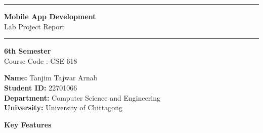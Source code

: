 \documentclass{article}
\begin{document}


\begin{titlepage}

\begin{center}

\vspace*{1cm}

\noindent\rule{\textwidth}{1.2pt}

\vspace{0.5cm}

{\Huge \bfseries Mobile App Development}\\[0.3cm]

{\large Lab Project Report}

\vspace{0.5cm}

\noindent\rule{\textwidth}{0.8pt}

\vspace{1.5cm}

\begin{tcolorbox}[
colback=white,
colframe=primary,
width=0.7\textwidth,
arc=6pt,
boxrule=1pt
]
\centering
\Large \textbf{6th Semester}\\[6pt]
\normalsize
Course Code : CSE 618
\end{tcolorbox}

\vspace{1.5cm}

\begin{tcolorbox}[
colback=white,
colframe=secondary,
width=0.7\textwidth,
arc=6pt
]
\begin{flushleft}
\textbf{Name:} Tanjim Tajwar Arnab\\
\textbf{Student ID:} 22701066\\
\textbf{Department:} Computer Science and Engineering\\
\textbf{University:} University of Chittagong
\end{flushleft}
\end{tcolorbox}

\vspace{1cm}

\begin{tcolorbox}[
colback=softblue,
colframe=primary,
width=0.7\textwidth,
arc=6pt
]
\small
\centering
\textbf{Key Features}\\


\end{tcolorbox}
\end{center}
\end{titlepage}
\end{document}
